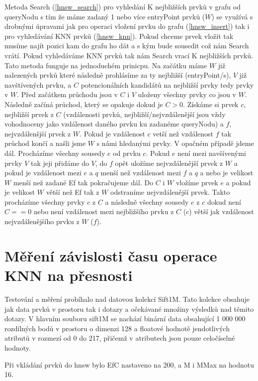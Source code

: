 \documentclass[czech,semestral,dept460,male,csharp,cpdeclaration]{diploma}
\begin{document}
		Metoda Search (\ref{hnsw_search}) pro vyhledání K nejbližších prvků v grafu od queryNodu s tím že máme zadaný 1 nebo více entryPoint prvků ($W$) se využívá s drobnými úpravami jak pro operaci vložení prvku do grafu (\ref{hnsw_insert}) tak i pro vyhledávání KNN prvků (\ref{hnsw_knn}). Pokud chceme prvek vložit tak musíme najít pozici kam do grafu ho dát a s kým bude sousedit což nám Search vrátí. Pokud vyhledáváme KNN prvků tak nám Search vrací K nejbližších prvků. Tato metoda funguje na jednoduchém prinicpu. Na začátku máme $W$ již nalezených prvků které následně prohlásíme za ty nejbližší (entryPoint/s), $V$ již navštívených prvku, a $C$ potencionálních kandidátů na nejbližší prvky tedy prvky v $W$. Před začátkem průchodu jsou v $C$ i $V$ uloženy všechny prvky co jsou v $W$. Následně začíná průchod, který se opakuje dokud je $C > 0$. Získáme si prvek $c$, nejbližší prvek z $C$ (vzdálenosti prvků, nejbližší/nejvzdálenější jsou vždy vohodnoceny jako vzdálenost daného prvku ku zadanéme queryNodu) a $f$, nejvzdálenšjší prvek z $W$. Pokud je vzdálenost $c$ vetší než vzdálenost $f$ tak průchod končí a našli jsme $W$ s námi hledanými prvky. V opačném případě jdeme dál. Procházíme všechny sousedy $e$ od prvku $c$. Pokud $e$ není mezi navšívenými prvky $V$ tak jeji přidáme do $V$, do $f$ opět uložíme nejvzdálenější prvek z $W$ a pokud je vzdálenost mezi $e$ a $q$ menší než vzdálenost mezi $f$ a $q$ a nebo je velikost $W$ menší než zadané Ef tak pokračujeme dál. Do $C$ i $W$ vložíme prvek $e$ a pokud je velikost $W$ větší než Ef tak z $W$ odstraníme nejvzdálenější prvek. Takto procházíme všechny prvky $c$ z $C$ a následně všechny sousedy $e$ z $c$ dokud není $C == 0$ nebo není vzdálenost mezi nejbližšího prvku z $C$ ($c$) větší jak vzdálenost nejvzdálenějšího prvku z $W$ ($f$).
		
		\section{Měření závislosti času operace KNN na přesnosti}
		
		Testování a měření probíhalo nad datovou kolekcí Sift1M. Tato kolekce obsahuje jak data prvků v prostoru tak i dotazy a očekávané množiny výsledků nad těmito dotazy. V hlavním souboru sift1M se nachází binární data obsahující 1 000 000 rozdílných bodů v prostoru o dimenzi 128 a floatové hodnotě jendotlivých atributů v rozmezí od 0 do 217, přičemž v atributech jsou pouze celočíselné hodnoty.
		
		Při vkládání prvků do hnsw bylo EfC nastaveno na 200, a M i MMax na hodnotu 16.
		
\end{document}
